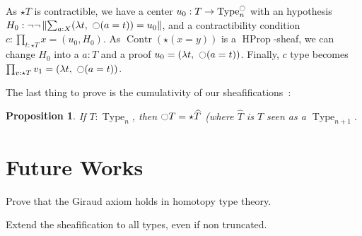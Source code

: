 \documentclass[conference]{IEEEtran}
\newtheorem{prop}[thm]{Proposition}
\DeclareMathOperator{\Type}{Type}
\DeclareMathOperator{\HProp}{HProp}
\DeclareMathOperator{\Contr}{Contr}
\newcommand{\modal}{\ensuremath{\ocircle}}
\begin{document}
As $\star T$ is contractible, we have a center $u_0 : T \to
\Type_n^\modal$ with an hypothesis $H_0 :  \lnot\lnot\left\| \sum_{a:X} 
            (\lambda t,~\modal (a=t)) = u_0\right\|$, and a
          contractibility condition $c : \prod_{t:\star T} x = (u_0,H_0)$.
As $\Contr (\star (x=y))$ is a $\HProp$-sheaf, we can change $H_0$
into a $a:T$ and a proof $u_0 = (\lambda t,~\modal (a=t))$.
Finally, $c$ type becomes $\prod_{v:\star T} v_1 =  (\lambda t,~\modal (a=t))$.


The last thing to prove is the cumulativity of our sheafifications~:
\begin{prop}
  If $T:\Type_n$, then $\modal T = \star \widehat T$ (where $\widehat
  T$ is $T$ seen as a $\Type_{n+1}$.
\end{prop}
\section{Future Works}
\label{sec:future-works}

Prove that the Giraud axiom holds in homotopy type theory.

Extend the sheafification to all types, even if non truncated.



%
%

\end{document}
